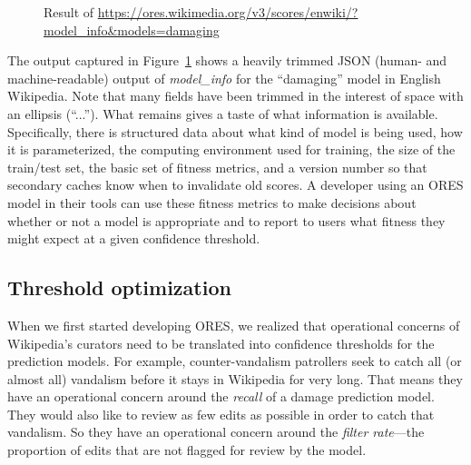 \begin{figure}[htbp]
        \caption{Result of \url{https://ores.wikimedia.org/v3/scores/enwiki/?model_info&models=damaging}}
        \label{fig:english_damaging_model_info}
\end{figure}

The output captured in Figure~\ref{fig:english_damaging_model_info} shows a heavily trimmed JSON (human- and machine-readable) output of \emph{model\_info} for the ``damaging'' model in English Wikipedia.  Note that many fields have been trimmed in the interest of space with an ellipsis (``...'').  What remains gives a taste of what information is available.  Specifically, there is structured data about what kind of model is being used, how it is parameterized, the computing environment used for training, the size of the train/test set, the basic set of fitness metrics, and a version number so that secondary caches know when to invalidate old scores.  A developer using an ORES model in their tools can use these fitness metrics to make decisions about whether or not a model is appropriate and to report to users what fitness they might expect at a given confidence threshold.

\subsection{Threshold optimization}
\label{sec:appendix.threshold_optimization}
When we first started developing ORES, we realized that operational concerns of Wikipedia's curators need to be translated into confidence thresholds for the prediction models.  For example, counter-vandalism patrollers seek to catch all (or almost all) vandalism before it stays in Wikipedia for very long.  That means they have an operational concern around the \emph{recall} of a damage prediction model.  They would also like to review as few edits as possible in order to catch that vandalism.  So they have an operational concern around the \emph{filter rate}---the proportion of edits that are not flagged for review by the model\cite{halfaker2016notes}.

